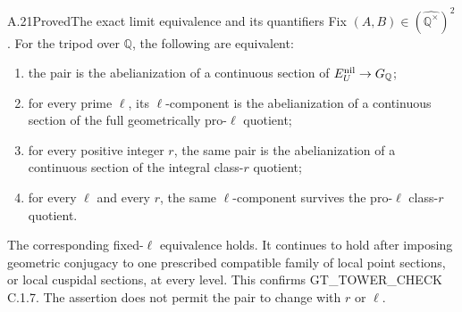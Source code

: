 \begin{result}{A.21}{Proved}{The exact limit equivalence and its quantifiers}
\label{coh:limit}
Fix $(A,B)\in(\widehat{\mathbb Q^{\times}})^2$. For the tripod over
$\mathbb Q$, the following are equivalent:
\begin{enumerate}
\item the pair is the abelianization of a continuous section of
      $E_U^{\rm nil}\to G_{\mathbb Q}$;
\item for every prime $\ell$, its $\ell$-component is the
      abelianization of a continuous section of the full geometrically
      pro-$\ell$ quotient;
\item for every positive integer $r$, the same pair is the
      abelianization of a continuous section of the integral class-$r$
      quotient;
\item for every $\ell$ and every $r$, the same $\ell$-component
      survives the pro-$\ell$ class-$r$ quotient.
\end{enumerate}
The corresponding fixed-$\ell$ equivalence holds. It continues to hold
after imposing geometric conjugacy to one prescribed compatible family
of local point sections, or local cuspidal sections, at every level.
This confirms GT\_TOWER\_CHECK C.1.7. The assertion does not permit
the pair to change with $r$ or $\ell$.
\end{result}
